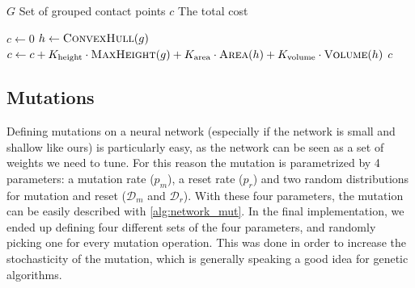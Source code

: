 \begin{algorithm}[ht]
\caption{Contact Points Grouping Cost Function}
\begin{algorithmic}[1]
    \Require $G$ Set of grouped contact points
    \Ensure $c$ The total cost

     
        \State $c \gets 0$
            \State $h \gets \Call{ConvexHull}{g}$
            \State $c \gets c + 
                K_{\text{height}} \cdot \Call{MaxHeight}{g} +
                K_{\text{area}} \cdot \Call{Area}{h} +
                K_{\text{volume}} \cdot \Call{Volume}{h}$
        \EndFor
        \State \Return $c$
    \EndProcedure
\end{algorithmic}
\label{alg:cpg_cf}
\end{algorithm}

\subsection{Mutations}
\label{sec:contact_points_grouping_mut}

Defining mutations on a neural network (especially if the network is small and shallow like ours)
is particularly easy, as the network can be seen as a set of weights we need to tune. For this reason
the mutation is parametrized by 4 parameters: a mutation rate ($p_m$), a reset rate ($p_r$)
and two random distributions for mutation and reset ($\mathcal{D}_m$ and $\mathcal{D}_r$).
With these four parameters, the mutation can be easily described with \cref{alg:network_mut}.
In the final implementation, we ended up defining four different sets of the four parameters,
and randomly picking one for every mutation operation.
This was done in order to increase the stochasticity of the mutation, which is generally
speaking a good idea for genetic algorithms.

